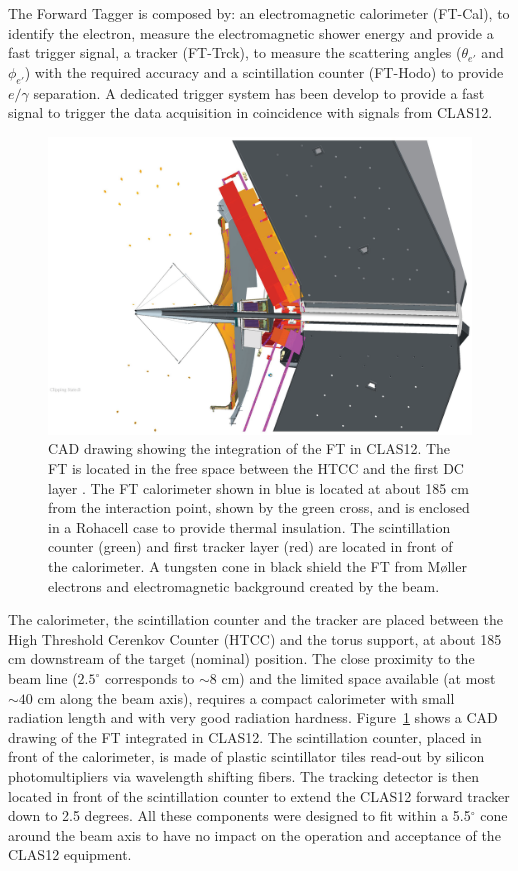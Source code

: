 The Forward Tagger is composed by: 
an electromagnetic calorimeter  (FT-Cal), to identify the
electron, measure the electromagnetic shower energy and provide a fast trigger signal, a tracker (FT-Trck),  to measure the scattering angles ($\theta_{e'}$ and $\phi_{e'}$) with the required accuracy and a  scintillation counter (FT-Hodo) to provide $e/\gamma$ separation. A dedicated trigger system has been develop to provide a fast signal to trigger the data acquisition in coincidence with signals from CLAS12.
\begin{figure}[th!]
\centering 
\includegraphics[width=\columnwidth]{./fig/ft_cad.eps} 
\caption{CAD drawing showing the integration of the FT in CLAS12. The FT is located in the free space between the HTCC \cite{htcc} and the first DC layer \cite{dc}. The FT calorimeter shown in blue is located at about 185 cm from the interaction point, shown by the green cross, and is enclosed in a Rohacell case to provide thermal insulation. The scintillation counter (green) and first tracker layer (red) are located in front of the calorimeter. A tungsten cone in black shield the FT from M{\o}ller electrons and electromagnetic background created by the beam. } 
\label{fig:calinclas12} 
\end{figure}

The calorimeter, the scintillation counter and the tracker
are placed between the High Threshold Cerenkov Counter (HTCC)  and the torus support, at about 185 cm downstream of the target (nominal) position. The close proximity
to the beam line ($2.5^\circ$ corresponds to $\sim 8$ cm) and the limited space available (at most $\sim 40$ cm along the beam axis), requires a compact calorimeter with small radiation length and with very good radiation hardness. Figure~\ref{fig:calinclas12} shows 
a CAD drawing of the FT integrated in CLAS12. 
The scintillation counter, placed in front of the calorimeter, is made of plastic scintillator tiles 
read-out by silicon photomultipliers via wavelength shifting fibers. The tracking detector is then located in front of the scintillation counter to extend the CLAS12 forward tracker down to 2.5 degrees.
All these components were designed to fit within a 5.5$^{\circ}$ cone around the beam axis to have no impact on the operation and acceptance of the CLAS12 equipment.

